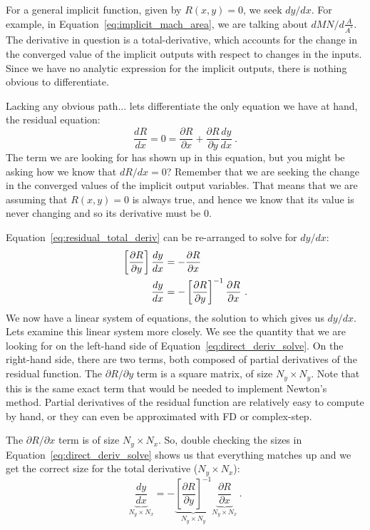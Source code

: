 \documentclass[conf]{new-aiaa}
\begin{document}
    For a general implicit function, given by $R(x,y)=0$, we seek $dy/dx$. 
    For example, in Equation~\eqref{eq:implicit_mach_area}, we are talking about $dMN/d\frac{A}{A^*}$. 
    The derivative in question is a total-derivative, which accounts for the change in the converged value of the implicit outputs with respect to changes in the inputs. 
    Since we have no analytic expression for the implicit outputs, there is nothing obvious to differentiate. 

    Lacking any obvious path... lets differentiate the only equation we have at hand, the residual equation: 
    \begin{equation}
        \frac{d R}{dx} = 0 = \frac{\partial R}{\partial x} + \frac{\partial R}{\partial y}\frac{dy}{dx}  \ . \label{eq:residual_total_deriv}
    \end{equation}
    The term we are looking for has shown up in this equation, but you might be asking how we know that $dR/dx=0$? 
    Remember that we are seeking the change in the converged values of the implicit output variables. 
    That means that we are assuming that $R(x,y)=0$ is always true, and hence we know that its value is never changing and so its derivative must be 0. 

    Equation~\eqref{eq:residual_total_deriv} can be re-arranged to solve for $dy/dx$: 
    \begin{align}
        \left[\frac{\partial R}{\partial y}\right] \frac{dy}{dx}& = - \frac{\partial R}{\partial x} \notag \\
        \frac{dy}{dx} &= - \left[\frac{\partial R}{\partial y}\right]^{-1} \frac{\partial R}{\partial x} \ . \label{eq:direct_deriv_solve}
    \end{align}
    We now have a linear system of equations, the solution to which gives us $dy/dx$. 
    Lets examine this linear system more closely. 
    We see the quantity that we are looking for on the left-hand side of Equation~\eqref{eq:direct_deriv_solve}.
    On the right-hand side, there are two terms, both composed of partial derivatives of the residual function. 
    The $\partial R/\partial y$ term is a square matrix, of size $N_y \times N_y$. 
    Note that this is the same exact term that would be needed to implement Newton's method. 
    Partial derivatives of the residual function are relatively easy to compute by hand, or they can even be approximated with FD or complex-step. 

    The $\partial R/\partial x$ term is of size $N_y \times N_x$. 
    So, double checking the sizes in Equation~\eqref{eq:direct_deriv_solve} shows us that everything matches up and we get the correct size for the total derivative ($N_y \times N_x$): 
    \begin{equation}
        \underbrace{\frac{dy}{dx}}_{N_y \times N_x} = 
        - \underbrace{\left[\frac{\partial R}{\partial y}\right]^{-1}}_{N_y \times N_y} 
        \underbrace{\frac{\partial R}{\partial x}}_{N_y \times N_x} \ . \label{eq:direct_deriv_solve}
    \end{equation}
\end{document}
